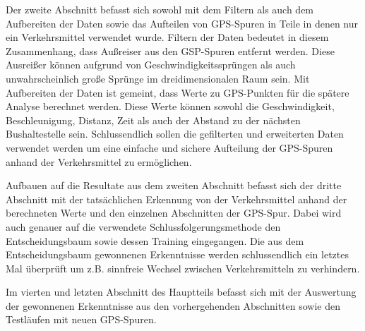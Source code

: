 Der zweite Abschnitt befasst sich sowohl mit dem Filtern als auch dem Aufbereiten der Daten sowie das Aufteilen von GPS-Spuren in Teile in denen nur ein Verkehrsmittel verwendet wurde. Filtern der Daten bedeutet in diesem Zusammenhang, dass Außreiser aus den GSP-Spuren entfernt werden. Diese Ausreißer können aufgrund von Geschwindigkeitssprüngen als auch unwahrscheinlich große Sprünge im dreidimensionalen Raum sein. Mit Aufbereiten der Daten ist gemeint, dass Werte zu GPS-Punkten für die spätere Analyse berechnet werden. Diese Werte können sowohl die Geschwindigkeit, Beschleunigung, Distanz, Zeit als auch der Abstand zu der nächsten Bushaltestelle sein. Schlussendlich sollen die gefilterten und erweiterten Daten verwendet werden um eine einfache und sichere Aufteilung der GPS-Spuren anhand der Verkehrsmittel zu ermöglichen.

Aufbauen auf die Resultate aus dem zweiten Abschnitt befasst sich der dritte Abschnitt mit der tatsächlichen Erkennung von der Verkehrsmittel anhand der berechneten Werte und den einzelnen Abschnitten der GPS-Spur. Dabei wird auch genauer auf die verwendete Schlussfolgerungsmethode den Entscheidungsbaum sowie dessen Training eingegangen. Die aus dem Entscheidungsbaum gewonnenen Erkenntnisse werden schlussendlich ein letztes Mal überprüft um z.B. sinnfreie Wechsel zwischen Verkehrsmitteln zu verhindern.

Im vierten und letzten Abschnitt des Hauptteils befasst sich mit der Auswertung der gewonnenen Erkenntnisse aus den vorhergehenden Abschnitten sowie den Testläufen mit neuen GPS-Spuren. 
